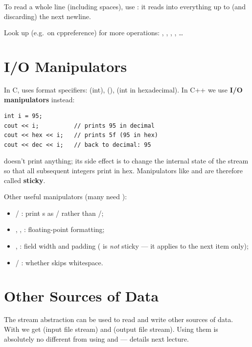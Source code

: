 To read a whole line (including spaces), use : it reads
into  everything up to (and discarding) the next newline.

Look up  (e.g.\ on cppreference) for more operations:
, , , , \dots

\section{I/O Manipulators}
In C,  uses format specifiers:  (int), 
(),  (int in hexadecimal). In C++ we use
\textbf{I/O manipulators} instead:
\begin{lstlisting}[style=cpp]
int i = 95;
cout << i;          // prints 95 in decimal
cout << hex << i;   // prints 5f (95 in hex)
cout << dec << i;   // back to decimal: 95
\end{lstlisting}
 doesn't print anything; its side effect is to change the internal
state of the stream so that all subsequent integers print in hex. Manipulators
like  and  are therefore called \textbf{sticky}.

Other useful manipulators (many need ):
\begin{itemize}
  \item {} / : print s as
        / rather than /;
  \item {}, , : floating-point
        formatting;
  \item {}, : field width and padding (
        is \emph{not} sticky --- it applies to the next item only);
  \item {} / : whether \code{>>} skips whitespace.
\end{itemize}

\section{Other Sources of Data}
The stream abstraction can be used to read and write other sources of data. With
 we get  (input file stream) and
 (output file stream). Using them is absolutely no different from
using  and  --- details next lecture.

